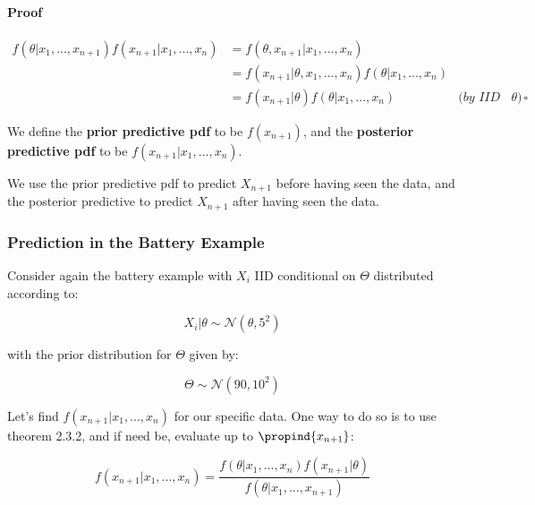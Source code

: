 \documentclass[a4paper]{article}
\begin{document}
                \paragraph{Proof}
                    \begin{align*}
                        f(\theta | x_1, ..., x_{n+1}) f(x_{n+1} | x_1, ..., x_n)
                            & = f(\theta, x_{n+1} | x_1, ..., x_n) \\
                        & = f(x_{n+1} | \theta, x_1, ..., x_n) f(\theta | x_1,
                            ..., x_n) \\
                        & = f(x_{n+1} | \theta) f(\theta | x_1, ..., x_n) &
                            \textit{(by IID on $\theta$)} \quad \square
                    \end{align*}

                \begin{definition}
                    We define the \textbf{prior predictive pdf} to be
                    $f(x_{n+1})$, and the \textbf{posterior predictive pdf} to
                    be $f(x_{n+1} | x_1, ..., x_n)$.

                    We use the prior predictive pdf to predict $X_{n+1}$ before
                    having seen the data, and the posterior predictive to
                    predict $X_{n + 1}$ after having seen the data.
                \end{definition}

            \subsubsection{Prediction in the Battery Example}
                Consider again the battery example with $X_i$ IID conditional on
                $\Theta$ distributed according to:

                \[
                    X_i | \theta \sim \mathcal{N}(\theta, 5^2)
                \]

                with the prior distribution for $\Theta$ given by:

                \[
                    \Theta \sim \mathcal{N}(90, 10^2)
                \]

                Let's find $f(x_{n+1} | x_1, ..., x_n)$ for our specific data.
                One way to do so is to use theorem 2.3.2, and if need be,
                evaluate up to $\propind{x_{n+1}}$:

                \[
                    f(x_{n+1} | x_1, ..., x_n) = \frac{f(\theta | x_1, ..., x_n)
                    f(x_{n+1} | \theta)}{f(\theta | x_1, ..., x_{n+1})}
                \]
\end{document}
